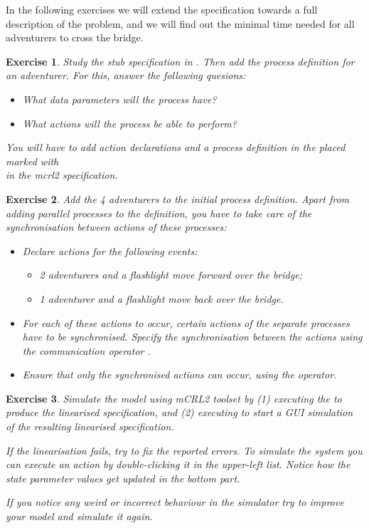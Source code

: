 \documentclass[11pt]{article}
\theoremstyle{myplain}
\newtheorem{exercise}{Exercise}
\theoremstyle{definition} %
\begin{document}
In the following exercises we will extend the specification towards a full description of the problem, and we will find out the minimal time needed for all adventurers to cross the bridge.


\begin{exercise}
Study the stub specification in . Then add the process definition for an adventurer. For this, answer the following quesions:
\begin{itemize}
  \item What data parameters will the process have?
  \item What actions will the process be able to perform?
\end{itemize} 
You will have to add action declarations and a process definition in the placed marked with\\ in the mcrl2 specification.
\end{exercise}


\begin{exercise}
Add the 4 adventurers to the initial process definition. Apart from adding parallel processes to the definition, you have to take care of the synchronisation between actions of these processes:
\begin{itemize}
  \item Declare actions for the following events:
  \begin{itemize}
    \item 2 adventurers and a flashlight move forward over the bridge;
    \item 1 adventurer and a flashlight move back over the bridge.
  \end{itemize}
  \item For each of these actions to occur, certain actions of the separate processes have to be synchronised. Specify the synchronisation between the actions using the communication operator .
  \item Ensure that only the synchronised actions can occur, using the  operator.
\end{itemize}
\end{exercise}
 
 
\begin{exercise}
Simulate the model using mCRL2 toolset by (1) executing the  to produce the linearised specification, and (2) executing  to start a GUI simulation of the resulting linearised specification.

If the linearisation fails, try to fix the reported errors.
To simulate the system you can execute an action by double-clicking it in the upper-left list. Notice how the state parameter values get updated in the bottom part.

If you notice any weird or incorrect behaviour in the simulator try to improve your model and simulate it again.
\end{exercise}
\end{document}

